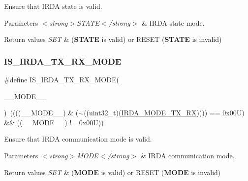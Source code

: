 Ensure that I\+R\+DA state is valid. 


\begin{DoxyParams}{Parameters}
{\em $<$strong$>$\+S\+T\+A\+T\+E$<$/strong$>$} & I\+R\+DA state mode. \\
\hline
\end{DoxyParams}

\begin{DoxyRetVals}{Return values}
{\em S\+ET} & ({\bfseries S\+T\+A\+TE} is valid) or R\+E\+S\+ET ({\bfseries S\+T\+A\+TE} is invalid) \\
\hline
\end{DoxyRetVals}
\mbox{\label{group___i_r_d_a___private___macros_ga31f1a9c7b9046663256277c2f639dbaf}} 
\subsubsection{\texorpdfstring{I\+S\+\_\+\+I\+R\+D\+A\+\_\+\+T\+X\+\_\+\+R\+X\+\_\+\+M\+O\+DE}{IS\_IRDA\_TX\_RX\_MODE}}
{\footnotesize\ttfamily \#define I\+S\+\_\+\+I\+R\+D\+A\+\_\+\+T\+X\+\_\+\+R\+X\+\_\+\+M\+O\+DE(\begin{DoxyParamCaption}\item[{}]{\+\_\+\+\_\+\+M\+O\+D\+E\+\_\+\+\_\+ }\end{DoxyParamCaption})~((((\+\_\+\+\_\+\+M\+O\+D\+E\+\_\+\+\_\+) \& ($\sim$((uint32\+\_\+t)(\hyperlink{group___i_r_d_a___transfer___mode_gada775794a25b76b7ecafc9bea3fc1f8a}{I\+R\+D\+A\+\_\+\+M\+O\+D\+E\+\_\+\+T\+X\+\_\+\+RX})))) == 0x00\+U) \&\& ((\+\_\+\+\_\+\+M\+O\+D\+E\+\_\+\+\_\+) != 0x00\+U))}



Ensure that I\+R\+DA communication mode is valid. 


\begin{DoxyParams}{Parameters}
{\em $<$strong$>$\+M\+O\+D\+E$<$/strong$>$} & I\+R\+DA communication mode. \\
\hline
\end{DoxyParams}

\begin{DoxyRetVals}{Return values}
{\em S\+ET} & ({\bfseries M\+O\+DE} is valid) or R\+E\+S\+ET ({\bfseries M\+O\+DE} is invalid) \\
\hline
\end{DoxyRetVals}
